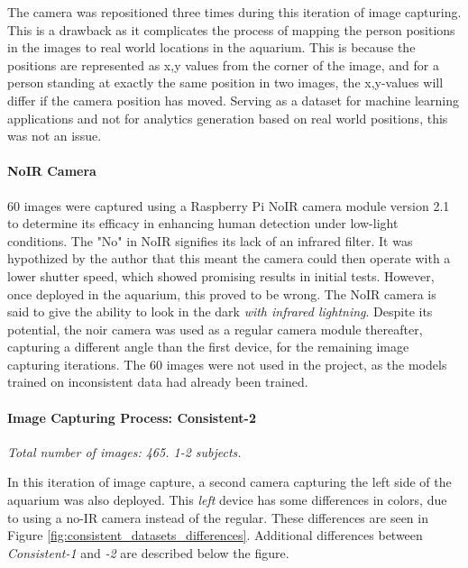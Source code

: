 The camera was repositioned three times during this iteration of image capturing. This is a drawback as it complicates the process of mapping the person positions in the images to real world locations in the aquarium. This is because the positions are represented as x,y values from the corner of the image, and for a person standing at exactly the same position in two images, the x,y-values will differ if the camera position has moved. Serving as a dataset for machine learning applications and not for analytics generation based on real world positions, this was not an issue.

\paragraph{NoIR Camera}
60 images were captured using a Raspberry Pi NoIR camera module version 2.1 to determine its efficacy in enhancing human detection under low-light conditions. The "No" in NoIR signifies its lack of an infrared filter. It was hypothized by the author that this meant the camera could then operate with a lower shutter speed, which showed promising results in initial tests. However, once deployed in the aquarium, this proved to be wrong. The NoIR camera is said to give the ability to look in the dark \textit{with infrared lightning}. Despite its potential, the noir camera was used as a regular camera module thereafter, capturing a different angle than the first device, for the remaining image capturing iterations. The 60 images were not used in the project, as the models trained on inconsistent data had already been trained.

\paragraph{Image Capturing Process: Consistent-2}
\label{sec:consistent_datasets_differences}
\textit{Total number of images: 465. 1-2 subjects.}

In this iteration of image capture, a second camera capturing the left side of the aquarium was also deployed. This \textit{left} device has some differences in colors, due to using a no-IR camera instead of the regular. These differences are seen in Figure \ref{fig:consistent_datasets_differences}. Additional differences between \textit{Consistent-1} and \textit{-2} are described below the figure.

